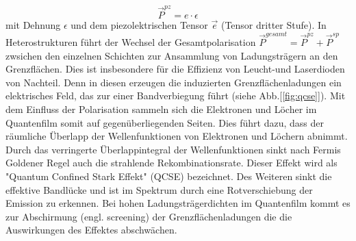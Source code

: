 %
\begin{equation}
    \vec{P}^{pz} = e \cdot \epsilon
\end{equation}
%
mit Dehnung $\epsilon$ und dem piezolektrischen Tensor $\vec{e}$ (Tensor dritter Stufe).
\newline
In Heterostrukturen führt der Wechsel der Gesamtpolarisation $\vec{P}^{gesamt} = \vec{P}^{pz} + \vec{P}^{sp}$ zwsichen den einzelnen Schichten zur Ansammlung von Ladungsträgern an den Grenzflächen. Dies ist insbesondere für die Effizienz von Leucht-und Laserdioden von Nachteil. Denn in diesen erzeugen die induzierten Grenzflächenladungen ein elektrisches Feld, das zur einer Bandverbiegung führt (siehe Abb.[\ref{fig:qcse}]). Mit dem Einfluss der Polarisation sammeln sich die Elektronen und Löcher im Quantenfilm somit auf gegenüberliegenden Seiten. Dies führt dazu, dass der räumliche Überlapp der Wellenfunktionen von Elektronen und Löchern abnimmt. Durch das verringerte Überlappintegral der Wellenfunktionen sinkt nach Fermis Goldener Regel auch die strahlende Rekombinationsrate. Dieser Effekt wird als "Quantum Confined Stark Effekt" (QCSE) bezeichnet. Des Weiteren sinkt die effektive Bandlücke und ist im Spektrum durch eine Rotverschiebung der Emission zu erkennen. Bei hohen Ladungsträgerdichten im Quantenfilm kommt es zur Abschirmung (engl. screening) der Grenzflächenladungen die die Auswirkungen des Effektes abschwächen.
